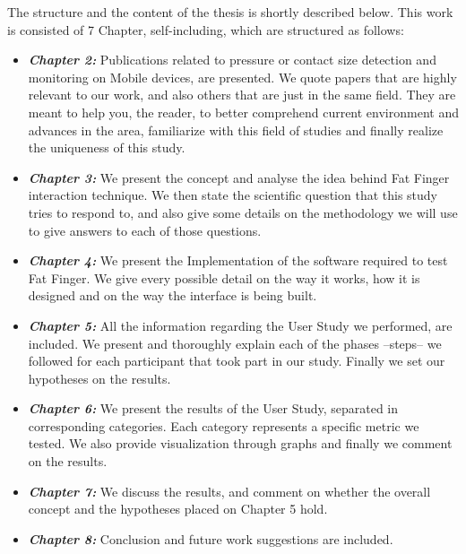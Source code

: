 The structure and the content of the thesis is shortly described below. This work is consisted of 7 Chapter, self-including, which are structured as follows:

\begin{itemize}
    \item \textbf{\textit{Chapter 2:}} Publications related to pressure or contact size detection and monitoring on Mobile devices, are presented. We quote papers that are highly relevant to our work, and also others that are just in the same field. They are meant to help you, the reader, to better comprehend current environment and advances in the area, familiarize with this field of studies and finally realize the uniqueness of this study.
    \item \textbf{\textit{Chapter 3:}} We present the concept and analyse the idea behind Fat Finger interaction technique. We then state the scientific question that this study tries to respond to, and also give some details on the methodology we will use to give answers to each of those questions.
    \item \textbf{\textit{Chapter 4:}} We present the Implementation of the software required to test Fat Finger. We give every possible detail on the way it works, how it is designed and on the way the interface is being built. 
    \item \textbf{\textit{Chapter 5:}} All the information regarding the User Study we performed, are included. We present and thoroughly explain each of the phases --steps-- we followed for each participant that took part in our study. Finally we set our hypotheses on the results.
    \item \textbf{\textit{Chapter 6:}} We present the results of the User Study, separated in corresponding categories. Each category represents a specific metric we tested. We also provide visualization through graphs and finally we comment on the results.
    \item \textbf{\textit{Chapter 7:}} We discuss the results, and comment on whether the overall concept and the hypotheses placed on Chapter 5 hold.
    \item \textbf{\textit{Chapter 8:}} Conclusion and future work suggestions  are included.
\end{itemize}   
